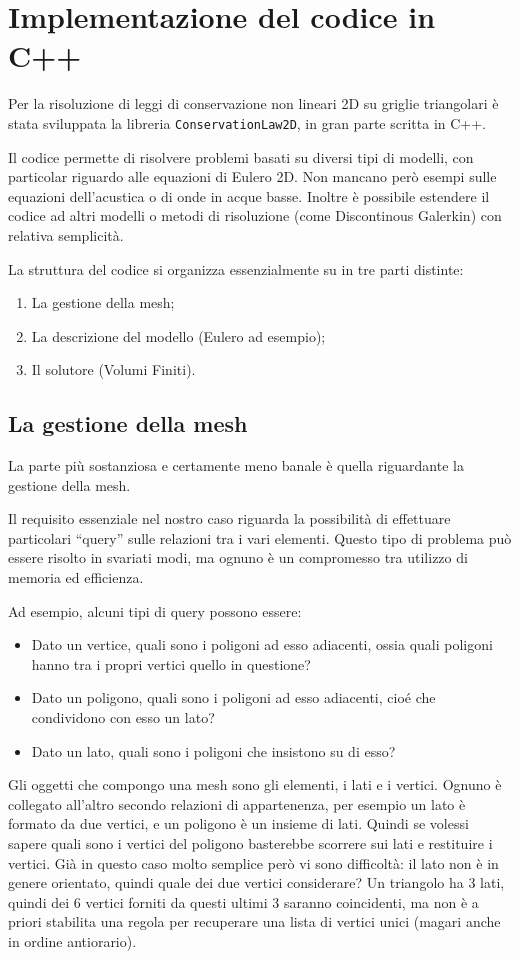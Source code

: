 \section{Implementazione del codice in C++}
Per la risoluzione di leggi di conservazione non lineari 2D su griglie triangolari è stata sviluppata la libreria \texttt{ConservationLaw2D}, in gran parte scritta in C++.

Il codice permette di risolvere problemi basati su diversi tipi di modelli, con particolar riguardo alle equazioni di Eulero 2D. Non mancano però esempi sulle equazioni dell'acustica o di onde in acque basse. Inoltre è possibile estendere il codice ad altri modelli o metodi di risoluzione (come Discontinous Galerkin) con relativa semplicità.

La struttura del codice si organizza essenzialmente su in tre parti distinte:
\begin{enumerate}
\item La gestione della mesh;
\item La descrizione del modello (Eulero ad esempio);
\item Il solutore (Volumi Finiti).
\end{enumerate}

\subsection{La gestione della mesh}
La parte più sostanziosa e certamente meno banale è quella riguardante la gestione della mesh. 

Il requisito essenziale nel nostro caso riguarda la possibilità di effettuare particolari ``query'' sulle relazioni tra i vari elementi. Questo tipo di problema può essere risolto in svariati modi, ma ognuno è un compromesso tra utilizzo di memoria ed efficienza.

Ad esempio, alcuni tipi di query possono essere:
\begin{itemize}
\item Dato un vertice, quali sono i poligoni ad esso adiacenti, ossia quali poligoni hanno tra i propri vertici quello in questione? 
\item Dato un poligono, quali sono i poligoni ad esso adiacenti, cioé che condividono con esso un lato? 
\item Dato un lato, quali sono i poligoni che insistono su di esso? 
\end{itemize}

Gli oggetti che compongo una mesh sono gli elementi, i lati e i vertici. Ognuno è collegato all'altro secondo relazioni di appartenenza, per esempio un lato è formato da due vertici, e un poligono è un insieme di lati. Quindi se volessi sapere quali sono i vertici del poligono basterebbe scorrere sui lati e restituire i vertici. Già in questo caso molto semplice però vi sono difficoltà: il lato non è in genere orientato, quindi quale dei due vertici considerare? Un triangolo ha 3 lati, quindi dei 6 vertici forniti da questi ultimi 3 saranno coincidenti, ma non è a priori stabilita una regola per recuperare una lista di vertici unici (magari anche in ordine antiorario).

